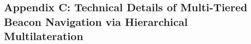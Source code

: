 \documentclass[10pt,runningheads]{llncs}
\begin{document}
\newpage
\subsection*{Appendix C: Technical Details of Multi-Tiered Beacon Navigation via Hierarchical Multilateration}
            

\end{document}
